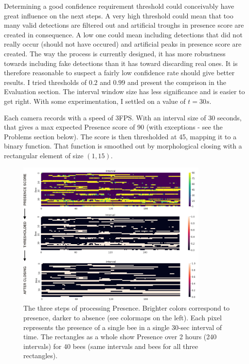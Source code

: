 Determining a good confidence requirement threshold could conceivably have great influence
on the next steps. A very high threshold could mean that too many valid
detections are filtered out and artificial troughs in presence score are created
in consequence. A low one could mean including detections that did not really
occur (should not have occured) and artificial peaks in presence score are
created. The way the process is currently designed, it has more robustness
towards including fake detections than it has toward discarding real ones. It is
therefore reasonable to suspect a fairly low confidence rate should give better results. 
I tried thresholds of $0.2$ and $0.99$ and present the comprison in the Evaluation section.
The interval window size has less significance and is easier to get right. With some experimentation, I settled on a value of $t=30s$.

Each camera records with a speed of 3FPS. With an interval size of 30 seconds,
that gives a max expected Presence score of 90 (with exceptions - see the Problems section below).
The score is then thresholded at 45,
mapping it to a binary function. That function is smoothed out by morphological
closing with a rectangular element of size $(1,15)$.

\begin{figure}[htbp!] 
\centering    
\includegraphics[width=0.85\textwidth]{presence-process}
\caption[presence-process]{The three steps of processing Presence. Brighter colors correspond to presence, darker to absence (see colormaps on the left). Each pixel represents the presence of a single bee in a single 30-sec interval of time. The rectangles as a whole show Presence over 2 hours (240 intervals) for 40 bees (same intervals and bees for all three rectangles).}
\label{fig:presence-process}
\end{figure}
\clearpage


